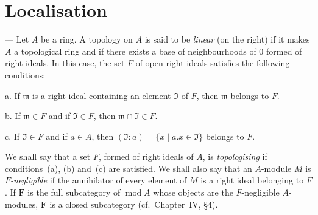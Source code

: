 %
%
%

\section{Localisation}

--- Let $A$ be a ring. A topology on $A$ is said to be \emph{linear} (on
the right) if it makes $A$ a topological ring and if there exists a base
of neighbourhoods of $0$ formed of right ideals. In this case, the set
$F$ of open right ideals satisfies the following conditions:

a. If $\mathfrak{m}$ is a right ideal containing an element $\mathfrak{I}$
of $F$, then $\mathfrak{m}$ belongs to $F$.

b. If $\mathfrak{m}\in F$ and if $\mathfrak{I}\in F$, then
$\mathfrak{m}\cap\mathfrak{I}\in F$.

c. If $\mathfrak{I}\in F$ and if $a\in A$, then
$(\mathfrak{I}:a)=\{x\mid a.x\in\mathfrak{I}\}$ belongs to $F$.

We shall say that a set $F$, formed of right ideals of $A$, is
\emph{topologising} if conditions~(a), (b) and~(c) are satisfied. We
shall also say that an $A$-module $M$ is \emph{$F$-negligible} if the
annihilator of every element of $M$ is a right ideal belonging to $F$.
If $\mathbf{F}$ is the full subcategory of $\operatorname{mod} A$ whose
objects are the $F$-negligible $A$-modules, $\mathbf{F}$ is a closed
subcategory (cf.\ Chapter~IV, \S4).

